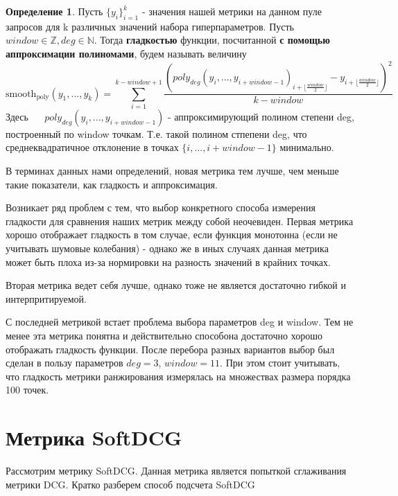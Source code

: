 \documentclass[14pt,a4paper]{amsart}
\theoremstyle{definition}
\newtheorem{definition}{Определение}[section]
\theoremstyle{definition}
\newcommand{\Sum}{\sum\limits}
\renewcommand\t{\text}
\renewcommand\b{\textbf}
\begin{document}
\begin{definition}
Пусть $\{y_i\}_{i=1}^k$ - значения нашей метрики на данном пуле запросов для k различных значений набора гиперпараметров. Пусть $window \in \mathbb{Z}, deg \in \mathbb{N}$. Тогда \b{гладкостью} функции, посчитанной \b{с помощью аппроксимации полиномами}, будем называть величину
\begin{equation}
\t{smooth}_\t{poly}(y_1,...,y_k) = \Sum_{i=1}^{k - window + 1} \frac{\left(poly_{deg}(y_i,...,y_{i + window - 1})_{i + \lfloor{\frac{window}{2}}\rfloor} - y_{i + \lfloor{\frac{window}{2}}\rfloor}\right)^2}{k - window}
\end{equation}
Здесь ~~ $poly_{deg}(y_i,...,y_{i + window - 1})$ - аппроксимирующий полином степени deg, построенный по window точкам. Т.е. такой полином стпепени deg, что среднеквадратичное отклонение в точках $\{i,...,i + window - 1\}$ минимально.
\end{definition}

В терминах данных нами определений, новая метрика тем лучше, чем меньше такие показатели, как гладкость и аппроксимация.

Возникает ряд проблем с тем, что выбор конкретного способа измерения гладкости для сравнения наших метрик между собой неочевиден. Первая метрика хорошо отображает гладкость в том случае, если функция монотонна (если не учитывать шумовые колебания) - однако же в иных случаях данная метрика может быть плоха из-за нормировки на разность значений в крайних точках. 

Вторая метрика ведет себя лучше, однако тоже не является достаточно гибкой и интерпритируемой.

С последней метрикой встает проблема выбора параметров deg и window. Тем не менее эта метрика понятна и действительно способона достаточно хорошо отображать гладкость функции. После перебора разных вариантов выбор был сделан в пользу параметров ${deg = 3}$, ${window = 11}$. При этом стоит учитывать, что гладкость метрики ранжирования измерялась на множествах размера порядка 100 точек.


\newpage
\section{Метрика SoftDCG}

Рассмотрим  метрику SoftDCG. Данная метрика является попыткой сглаживания метрики DCG. Кратко разберем способ подсчета SoftDCG
\end{document}
